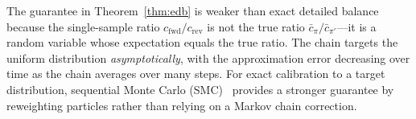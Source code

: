 \begin{remark}
\label{rem:edb-vs-exact}
The guarantee in Theorem~\ref{thm:edb} is weaker than exact detailed balance
because the single-sample ratio $c_{\mathrm{fwd}} / c_{\mathrm{rev}}$ is not
the true ratio $\bar{c}_\pi / \bar{c}_{\pi'}$---it is a random variable
whose expectation equals the true ratio.
The chain targets the uniform distribution \emph{asymptotically}, with the
approximation error decreasing over time as the chain averages over many
steps.
For exact calibration to a target distribution, sequential Monte Carlo
(SMC)~\citep{dellaLibera2026smc,mccartan2020} provides a stronger guarantee
by reweighting particles rather than relying on a Markov chain correction.
\end{remark}
